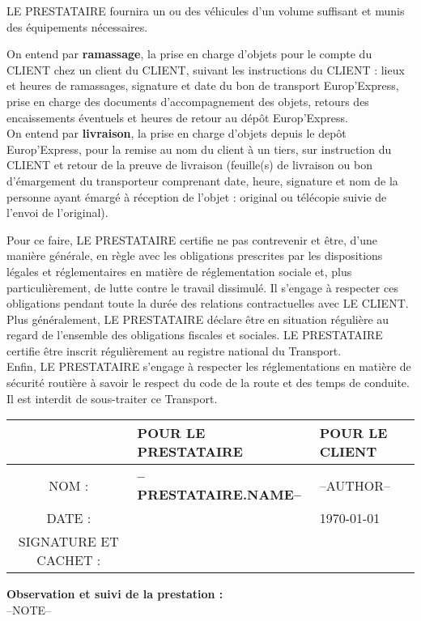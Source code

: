 \documentclass[a4paper, oneside, 8pt, french]{article}
\begin{document}
LE PRESTATAIRE fournira un ou des véhicules d'un volume suffisant et munis des équipements nécessaires.

On entend par \textbf{ramassage}, la prise en charge d'objets pour le compte du CLIENT chez un client du CLIENT, suivant les instructions du CLIENT : lieux et heures de ramassages, signature et date du bon de transport Europ'Express, prise en charge des documents d'accompagnement des objets, retours des encaissements éventuels et heures de retour au dépôt Europ'Express.\\
On entend par \textbf{livraison}, la prise en charge d'objets depuis le depôt Europ'Express, pour la remise au nom du client à un tiers, sur instruction du CLIENT et retour de la preuve de livraison (feuille(s) de livraison ou bon d'émargement du transporteur comprenant date, heure, signature et nom de la personne ayant émargé à réception de l'objet : original ou télécopie suivie de l'envoi de l'original).

Pour ce faire, LE PRESTATAIRE certifie ne pas contrevenir et être, d'une manière générale, en règle avec les obligations prescrites par les dispositions légales et réglementaires en matière de réglementation sociale et, plus particulièrement, de lutte contre le travail dissimulé. Il s'engage à respecter ces obligations pendant toute la durée des relations contractuelles avec LE CLIENT. Plus généralement, LE PRESTATAIRE déclare être en situation régulière au regard de l'ensemble des obligations fiscales et sociales. LE PRESTATAIRE certifie être inscrit régulièrement au registre national du Transport.\\
Enfin, LE PRESTATAIRE s'engage à respecter les réglementations en matière de sécurité routière à savoir le respect du code de la route et des temps de conduite.\\
Il est interdit de sous-traiter ce Transport.

\begin{center}
\begin{tabular}{|c|p{6cm}|p{6cm}|}
\hline 
 & POUR LE PRESTATAIRE & POUR LE CLIENT \\ 
\hline
 NOM : & \textbf{--PRESTATAIRE.NAME--} & --AUTHOR-- \\ 
\hline
DATE : &  & \today \\ 
\hline
SIGNATURE ET CACHET : &  &  
\\ [1cm]
\hline 
\end{tabular} 
\end{center}

\begin{fminipage}
\textbf{Observation et suivi de la prestation :} \\ 
--NOTE--
\end{fminipage}
\end{document}
